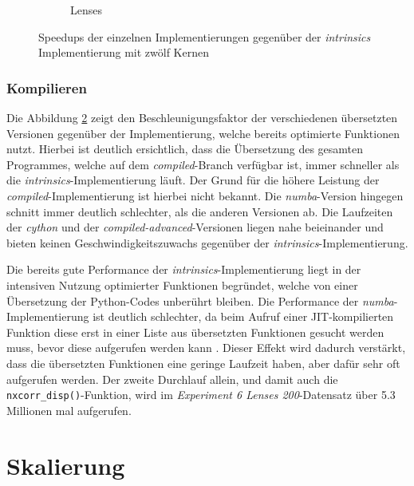 \begin{center}
\begin{figure}[htbp]
\begin{subfigure}[b]{0.54\textwidth}
			\caption{Lenses}
			\label{fig:speedups_lenses}
		\end{subfigure}
		\caption{Speedups der einzelnen Implementierungen gegenüber der \textit{intrinsics} Implementierung mit zwölf Kernen}
		\label{fig:speedups}
	\end{figure}
\end{center}

\subsubsection{Kompilieren}

Die Abbildung \ref{fig:speedups} zeigt den Beschleunigungsfaktor der verschiedenen übersetzten Versionen gegenüber der Implementierung, welche bereits optimierte Funktionen nutzt. Hierbei ist deutlich ersichtlich, dass die Übersetzung des gesamten Programmes, welche auf dem \textit{compiled}-Branch verfügbar ist, immer schneller als die \textit{intrinsics}-Implementierung läuft. Der Grund für die höhere Leistung der \textit{compiled}-Implementierung ist hierbei nicht bekannt. Die \textit{numba}-Version hingegen schnitt immer deutlich schlechter, als die anderen Versionen ab. Die Laufzeiten der \textit{cython} und der \textit{compiled-advanced}-Versionen liegen nahe beieinander und bieten keinen Geschwindigkeitszuwachs gegenüber der \textit{intrinsics}-Implementierung. 

Die bereits gute Performance der \textit{intrinsics}-Implementierung liegt in der intensiven Nutzung optimierter Funktionen begründet, welche von einer Übersetzung der Python-Codes unberührt bleiben. Die Performance der \textit{numba}-Implementierung ist deutlich schlechter, da beim Aufruf einer \gls{JIT}-kompilierten Funktion diese erst in einer Liste aus übersetzten Funktionen gesucht werden muss, bevor diese aufgerufen werden kann \cite{PKA17}. Dieser Effekt wird dadurch verstärkt, dass die übersetzten Funktionen eine geringe Laufzeit haben, aber dafür sehr oft aufgerufen werden. Der zweite Durchlauf allein, und damit auch die \texttt{nxcorr\_disp()}-Funktion, wird im \textit{Experiment 6 Lenses 200}-Datensatz über 5.3 Millionen mal aufgerufen. 

\section{Skalierung}

